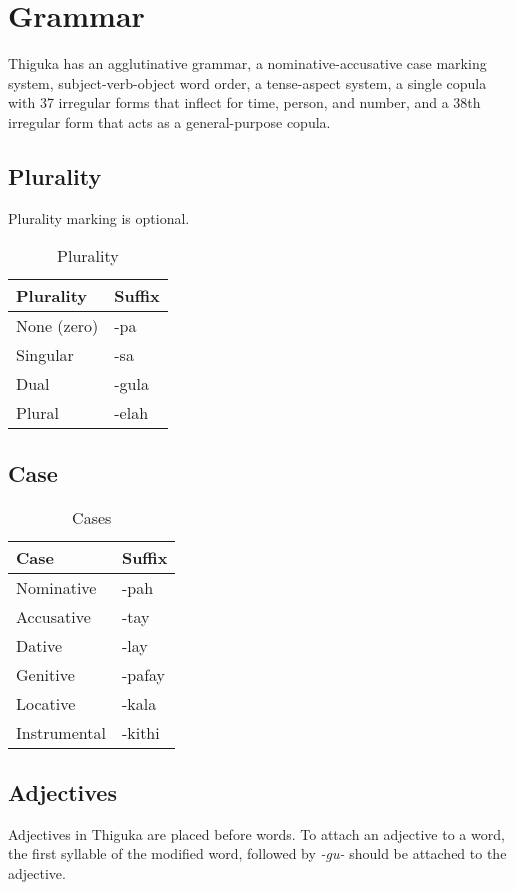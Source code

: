 
\newpage
\section{Grammar}
Thiguka has an agglutinative grammar, a nominative-accusative case marking system, subject-verb-object word order, a tense-aspect system, a single copula with 37 irregular forms that inflect for time, person, and number, and a 38th irregular form that acts as a general-purpose copula.

\subsection{Plurality}
Plurality marking is optional.

\begin{table}[h!]
    \centering
    \begin{tabularx}{8cm}{|X|X|}
        \hline
        \textbf{Plurality} & \textbf{Suffix} \\
        \hline
        None (zero) & -pa \\
        Singular & -sa \\
        Dual & -gula \\
        Plural & -elah \\
        \hline
    \end{tabularx}
    \caption{Plurality}
\end{table}

\subsection{Case}
\begin{table}[h!]
    \centering
    \begin{tabularx}{8cm}{|X|X|}
        \hline
        \textbf{Case} & \textbf{Suffix} \\
        \hline
        Nominative & -pah \\
        Accusative & -tay \\
        Dative & -lay \\
        Genitive & -pafay \\
        Locative & -kala \\
        Instrumental & -kithi \\ 
        \hline
    \end{tabularx}
    \caption{Cases}
\end{table}

\subsection{Adjectives}
Adjectives in Thiguka are placed before words. To attach an adjective to a word, the first syllable of the modified word, followed by \emph{-gu-} should be attached to the adjective.

